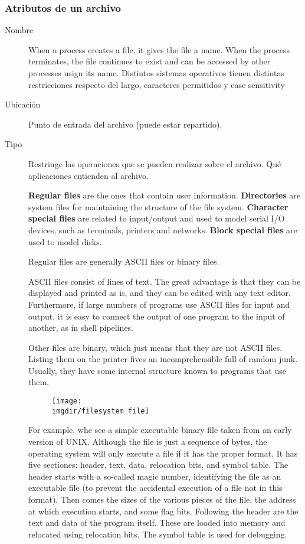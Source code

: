 \documentclass[a4paper, twoside]{article}
\newcommand{\imgdir}{../resources/images} %
\begin{document}
\subsubsection{Atributos de un archivo}
\begin{description}
	\item[Nombre] When a process creates a file, it gives the file a name. When the process terminates, the file continues to exist and can be accessed by other processes usign its name. Distintos sistemas operativos tienen distintas restricciones respecto del largo, caracteres permitidos y case sensitivity
	
	\item[Ubicación] Punto de entrada del archivo (puede estar repartido).

	\item[Tipo] Restringe las operaciones que se pueden realizar sobre el archivo. Qué aplicaciones entienden al archivo.

	\textbf{Regular files} are the ones that contain user information. \textbf{Directories} are system files for maintaining the structure of the file system. \textbf{Character special files} are related to input/output and used to model serial I/O devices, such as terminals, printers and networks. \textbf{Block special files} are used to model disks.

	Regular files are generally ASCII files or binary files. 

	ASCII files consist of lines of text. The great advantage is that they can be displayed and printed as is, and they can be edited with any text editor. Furthermore, if large numbers of programs use ASCII files for input and output, it is easy to connect the output of one program to the input of another, as in shell pipelines.

	Other files are binary, which just means that they are not ASCII files. Listing them on the printer fives an incomprehensible full of random junk. Usually, they have some internal structure known to programs that use them.
	
	\begin{figure}[H]
		\centering
		\texttt{[image: \\imgdir/filesystem\_file]}
		\label{fig:filesystem_file}
	\end{figure}	
	
	For example, whe see a simple executable binary file taken from an early version of UNIX. Although the file is just a sequence of bytes, the operating system will only execute a file if it has the proper format. It has five sectiones: header, text, data, relocation bits, and symbol table. The header starts with a so-called magic number, identifying the file as an executable file (to prevent the accidental execution of a file not in this format). Then comes the sizes of the various pieces of the file, the address at which execution starts, and some flag bits. Following the header are the text and data of the program itself. These are loaded into memory and relocated using relocation bits. The symbol table is used for debugging.


\end{description}
\end{document}
